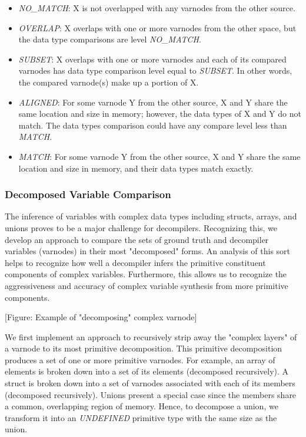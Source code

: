 \begin{itemize}
    \item \emph{NO\_MATCH}: X is not overlapped with any varnodes from the other source.
    \item \emph{OVERLAP}: X overlaps with one or more varnodes from the other space, but the data type comparisons are level \emph{NO\_MATCH}.
    \item \emph{SUBSET}: X overlaps with one or more varnodes and each of its compared varnodes has data type comparison level equal to \emph{SUBSET}. In other words, the compared varnode(s) make up a portion of X.
    \item \emph{ALIGNED}: For some varnode Y from the other source, X and Y share the same location and size in memory; however, the data types of X and Y do not match. The data types comparison could have any compare level less than \emph{MATCH}.
    \item \emph{MATCH}: For some varnode Y from the other source, X and Y share the same location and size in memory, and their data types match exactly.
\end{itemize}

\subsubsection{Decomposed Variable Comparison}

The inference of variables with complex data types including structs, arrays, and unions proves to be a major challenge for decompilers. Recognizing this, we develop an approach to compare the sets of ground truth and decompiler variables (varnodes) in their most "decomposed" forms. An analysis of this sort helps to recognize how well a decompiler infers the primitive constituent components of complex variables. Furthermore, this allows us to recognize the aggressiveness and accuracy of complex variable synthesis from more primitive components.

[Figure: Example of "decomposing" complex varnode]

We first implement an approach to recursively strip away the "complex layers" of a varnode to its most primitive decomposition. This primitive decomposition produces a set of one or more primitive varnodes. For example, an array of elements is broken down into a set of its elements (decomposed recursively). A struct is broken down into a set of varnodes associated with each of its members (decomposed recursively). Unions present a special case since the members share a common, overlapping region of memory. Hence, to decompose a union, we transform it into an \emph{UNDEFINED} primitive type with the same size as the union.

